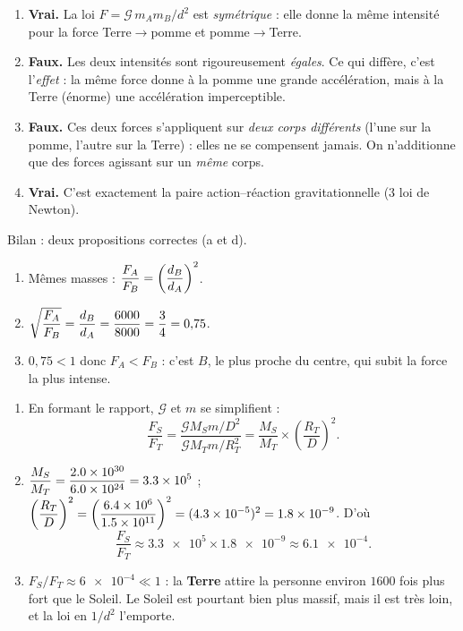 \documentclass[11pt,a4paper]{article}
\begin{document}

\begin{corrige}
\begin{enumerate}[label=\alph*)]
  \item \textbf{Vrai.} La loi $F=\mathcal{G}\,m_A m_B/d^2$ est \emph{symétrique} :
        elle donne la même intensité pour la force Terre$\to$pomme et pomme$\to$Terre.
  \item \textbf{Faux.} Les deux intensités sont rigoureusement \emph{égales}. Ce qui
        diffère, c'est l'\emph{effet} : la même force donne à la pomme une grande
        accélération, mais à la Terre (énorme) une accélération imperceptible.
  \item \textbf{Faux.} Ces deux forces s'appliquent sur \emph{deux corps différents}
        (l'une sur la pomme, l'autre sur la Terre) : elles ne se compensent jamais. On
        n'additionne que des forces agissant sur un \emph{même} corps.
  \item \textbf{Vrai.} C'est exactement la paire action--réaction gravitationnelle
        (3 loi de Newton).
\end{enumerate}
Bilan : deux propositions correctes (a et d).
\end{corrige}

\begin{corrige}
\begin{enumerate}[label=\alph*)]
  \item Mêmes masses : $\displaystyle \frac{F_A}{F_B}=\left(\frac{d_B}{d_A}\right)^2$.
  \item $\displaystyle \sqrt{\frac{F_A}{F_B}}=\frac{d_B}{d_A}=\frac{6000}{8000}=\frac34=0{,}75$.
  \item $0{,}75<1$ donc $F_A<F_B$ : c'est \textbf{$B$}, le plus proche du centre, qui
        subit la force la plus intense.
\end{enumerate}
\end{corrige}

\begin{corrige}
\begin{enumerate}[label=\alph*)]
  \item En formant le rapport, $\mathcal{G}$ et $m$ se simplifient :
        \[
        \frac{F_S}{F_T}=\frac{\mathcal{G}M_S m/D^2}{\mathcal{G}M_T m/R_T^2}
        =\frac{M_S}{M_T}\times\left(\frac{R_T}{D}\right)^2.
        \]
  \item $\displaystyle \frac{M_S}{M_T}=\frac{\num{2.0e30}}{\num{6.0e24}}=\num{3.3e5}$ ;
        $\displaystyle \left(\frac{R_T}{D}\right)^2=\left(\frac{\num{6.4e6}}{\num{1.5e11}}\right)^2
        =(\num{4.3e-5})^2=\num{1.8e-9}$. D'où
        \[
        \frac{F_S}{F_T}\approx\num{3.3e5}\times\num{1.8e-9}\approx\num{6.1e-4}.
        \]
  \item $F_S/F_T\approx\num{6e-4}\ll 1$ : la \textbf{Terre} attire la personne environ
        $1600$ fois plus fort que le Soleil. Le Soleil est pourtant bien plus massif,
        mais il est très loin, et la loi en $1/d^2$ l'emporte.
\end{enumerate}
\end{corrige}
\end{document}
